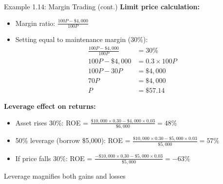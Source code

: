 \documentclass[10pt]{beamer}
\begin{document}
\begin{frame}{Example 1.14: Margin Trading (cont.)}
  \textbf{Limit price calculation:}
  \begin{itemize}
    \item Margin ratio: $\tfrac{100P - \$4,000}{100P}$
    \item Setting equal to maintenance margin (30\%):
    \begin{align*}
      \tfrac{100P - \$4,000}{100P} &= 30\%\\
      100P - \$4,000 &= 0.3 \times 100P\\
      100P - 30P &= \$4,000\\
      70P &= \$4,000\\
      P &= \$57.14
    \end{align*}
  \end{itemize}
  
  \pause
  \textbf{Leverage effect on returns:}
  \begin{itemize}
    \item Asset rises 30\%: ROE = $\tfrac{\$10,000 \times 0.30 - \$4,000 \times 0.03}{\$6,000} = 48\%$
    \item 50\% leverage (borrow \$5,000): ROE = $\tfrac{\$10,000 \times 0.30 - \$5,000 \times 0.03}{\$5,000} = 57\%$
    \item If price falls 30\%: ROE = $\tfrac{-\$10,000 \times 0.30 - \$5,000 \times 0.03}{\$5,000} = -63\%$
  \end{itemize}
  
  \pause
  Leverage magnifies both gains and losses
\end{frame}
\end{document}
